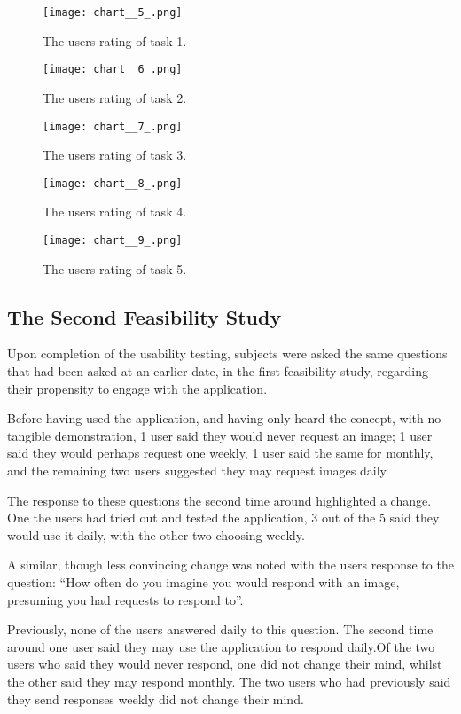 \documentclass[a4paper]{article}
\begin{document}
\begin{figure}[H]
\centering
\texttt{[image: chart\_\_5\_.png]}
\caption{ The users rating of task 1.
}
\label{fig:usabilityG1}
\end{figure}
\begin{figure}[H]
\centering
\texttt{[image: chart\_\_6\_.png]}
\caption{ The users rating of task 2.
}
\label{fig:usabilityG2}
\end{figure}
\begin{figure}[H]
\centering
\texttt{[image: chart\_\_7\_.png]}
\caption{ The users rating of task 3.
}
\label{fig:usabilityG3}
\end{figure}
\begin{figure}[H]
\centering
\texttt{[image: chart\_\_8\_.png]}
\caption{ The users rating of task 4.
}
\label{fig:usabilityG4}
\end{figure}
\begin{figure}[H]
\centering
\texttt{[image: chart\_\_9\_.png]}
\caption{ The users rating of task 5.
}
\label{fig:usabilityG5}
\end{figure}

\subsection{The Second Feasibility Study}
Upon completion of the usability testing, subjects were asked the same questions that had been asked at an earlier date, in the first feasibility study, regarding their propensity to engage with the application. 

Before having used the application, and having only heard the concept, with no tangible demonstration, 1 user said they would never request an image; 1 user said they would perhaps request one weekly, 1 user said the same for monthly, and the remaining two users suggested they may request images daily.

The response to these questions the second time around highlighted a change. One the users had tried out and tested the application, 3 out of the 5 said they would use it daily, with the other two choosing weekly.

A similar, though less convincing change was noted with the users response to the question: ``How often do you imagine you would respond with an image, presuming you had requests to respond to''.

Previously, none of the users answered daily to this question. The second time around one user said they may use the application to respond daily.Of the two users who said they would never respond, one did not change their mind, whilst the other said they may respond monthly. The two users who had previously said they send responses weekly did not change their mind.
\end{document}
